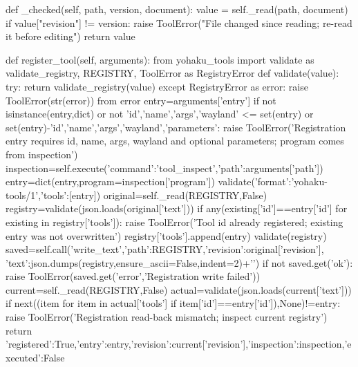     def _checked(self, path, version, document):
        value = self._read(path, document)
        if value["revision"] != version:
            raise ToolError("File changed since reading; re-read it before editing")
        return value

    def register_tool(self, arguments):
        from yohaku_tools import validate as validate_registry, REGISTRY, ToolError as RegistryError
        def validate(value):
            try:
                return validate_registry(value)
            except RegistryError as error:
                raise ToolError(str(error)) from error
        entry=arguments['entry']
        if not isinstance(entry,dict) or not {'id','name','args','wayland'} <= set(entry) or set(entry)-{'id','name','args','wayland','parameters'}:
            raise ToolError('Registration entry requires id, name, args, wayland and optional parameters; program comes from inspection')
        inspection=self.execute({'command':'tool_inspect','path':arguments['path']})
        entry=dict(entry,program=inspection['program'])
        validate({'format':'yohaku-tools/1','tools':[entry]})
        original=self._read(REGISTRY,False)
        registry=validate(json.loads(original['text']))
        if any(existing['id']==entry['id'] for existing in registry['tools']):
            raise ToolError('Tool id already registered; existing entry was not overwritten')
        registry['tools'].append(entry)
        validate(registry)
        saved=self.call('write_text',{'path':REGISTRY,'revision':original['revision'],
                                     'text':json.dumps(registry,ensure_ascii=False,indent=2)+'\n'})
        if not saved.get('ok'):
            raise ToolError(saved.get('error','Registration write failed'))
        current=self._read(REGISTRY,False)
        actual=validate(json.loads(current['text']))
        if next((item for item in actual['tools'] if item['id']==entry['id']),None)!=entry:
            raise ToolError('Registration read-back mismatch; inspect current registry')
        return {'registered':True,'entry':entry,'revision':current['revision'],'inspection':inspection,'executed':False}

